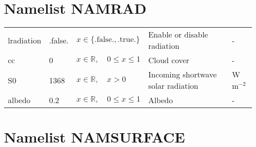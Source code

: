 \documentclass[twoside,11pt,fleqn,a4paper,english,openright]{report}
\begin{document}
\section{Namelist NAMRAD}\label{par:namrad}

\begin{center}
  \tablehead{
  }
  \tablelasttail{
        &&&&\\\hline
  }
\begin{supertabular}{|l|p{1.6cm}|p{4cm}|p{6.3cm}|l|}
  lradiation	&	.false.	&	$x\in\{\text{.false.},\text{.true.}\}$	& Enable or disable radiation	& -\\
  cc		&	0		&	$x \in \mathbb{R}, \quad 0 \leq x \leq 1$		& Cloud cover	&	-\\
  S0		&	1368	&	$x \in \mathbb{R}, \quad  x > 0$		& Incoming shortwave solar radiation	&	W m$^{-2}$\\
  albedo	&	0.2		&	$x \in \mathbb{R}, \quad 0 \leq x \leq 1$		& Albedo	&	-\\
\end{supertabular}
\end{center}

\section{Namelist NAMSURFACE}\label{par:namsurface}
\end{document}
